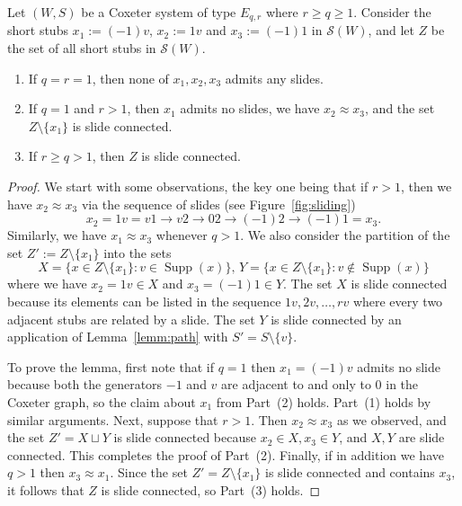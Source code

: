 \documentclass[ALCO,Unicode,published]{cedram}
\newcommand{\sw}{\mathcal{S}(W)}
\newcommand{\ra}{\rightarrow}
\DeclareMathOperator{\supp}{\mathrm{Supp}}
\begin{document}
\begin{lemma}
\label{lemm:Esliding}
Let $(W,S)$ be a Coxeter system of type $E_{q,r}$ where $r\ge q\ge 1$. Consider the short stubs $x_1:=(-1)v$,
$x_2:=1v$ and $x_3:=(-1)1$ in $\sw$, and let $Z$ be the set of all short stubs in $\sw$. 
    \begin{enumerate}
        \item If $q=r=1$, then none of $x_1,x_2,x_3$ admits any slides.
        \item If $q=1$ and $r>1$, then $x_1$ admits no slides, we have $x_2\approx x_3$, and the set
            $Z\setminus\{x_1\}$ is slide connected. 
         \item If $r\ge q>1$, then $Z$ is slide connected. 
    \end{enumerate}
\end{lemma}


\begin{proof}
    We start with some observations, the key one being that if $r>1$, then we have $x_2\approx x_3$ via the
    sequence of slides (see Figure~\ref{fig:sliding}) 
    \begin{equation}
    \label{eq:slidings} 
    x_2=1v=v1\ra v2 \ra 02\ra (-1)2\ra (-1)1=x_3.
    \end{equation} 
    Similarly, we have $x_1\approx x_3$ whenever $q>1$. We also consider the partition of the set
    $Z':=Z\setminus\{x_1\}$ into the sets \[ X=\{x\in Z\setminus\{x_1\}: v\in
    \supp(x)\},\, Y=\{x\in
    Z\setminus\{x_1\}: v\not\in \supp(x)\}  \] 
    where we have $x_2=1v\in X$ and $x_3=(-1)1\in Y$. The set $X$ is slide connected because its
    elements can be listed in the sequence $1v, 2v, \dots, rv$ where every two adjacent stubs are
    related by a slide. The set $Y$ is slide connected by an application of Lemma~\ref{lemm:path} with
    $S'=S\setminus\{v\}$.  
 
    To prove the lemma, first note that if $q=1$ then $x_1=(-1)v$ admits no slide because  both the
    generators $-1$ and $v$ are adjacent to and only to $0$ in the Coxeter graph, so the claim about
    $x_1$ from Part~(2) holds. Part~(1) holds by similar arguments.  Next, suppose that $r>1$. Then
    $x_2\approx x_3$ as we observed, and the set $Z'=X\sqcup Y$ is slide connected because $x_2\in
    X, x_3\in Y$, and $X,Y$ are slide connected. This completes the proof of Part~(2). Finally, if
    in addition we have $q>1$ then $x_3\approx x_1$. Since the set $Z'=Z\setminus\{x_1\}$ is slide
    connected and contains $x_3$, it follows that $Z$ is slide connected, so Part~(3) holds.
\end{proof}
\end{document}
